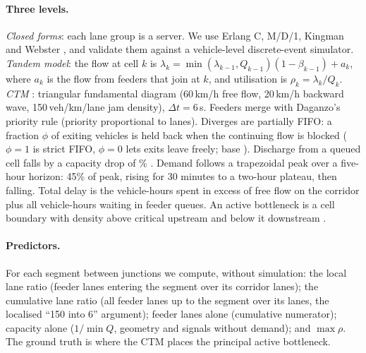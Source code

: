 \paragraph{Three levels.} \emph{Closed forms}: each lane group is a
server. We use Erlang C, M/D/1, Kingman \cite{kingman1961heavy} and
Webster \cite{webster1958signal}, and validate them against a
vehicle-level discrete-event simulator. \emph{Tandem model}: the flow at
cell $k$ is $\lambda_k = \min(\lambda_{k-1}, Q_{k-1})(1-\beta_{k-1}) +
a_k$, where $a_k$ is the flow from feeders that join at $k$, and
utilisation is $\rho_k = \lambda_k / Q_k$. \emph{CTM}
\cite{daganzo1994ctm,daganzo1995ctm}: triangular fundamental diagram
(60\,km/h free flow, 20\,km/h backward wave, 150\,veh/km/lane jam
density), $\Delta t = 6$\,s. Feeders merge with Daganzo's priority rule
(priority proportional to lanes). Diverges are partially FIFO: a fraction
$\phi$ of exiting vehicles is held back when the continuing flow is
blocked ($\phi = 1$ is strict FIFO, $\phi=0$ lets exits leave freely;
base \ThFifo). Discharge from a queued cell falls by a capacity drop of
\ThDrop\% \cite{hall1991capacity,chung2007capacity}. Demand follows a
trapezoidal peak over a five-hour horizon: 45\% of peak, rising for 30
minutes to a two-hour plateau, then falling. Total delay is the
vehicle-hours spent in excess of free flow on the corridor plus all
vehicle-hours waiting in feeder queues. An active bottleneck is a cell
boundary with density above critical upstream and below it downstream
\cite{cassidy1999bottlenecks}.

\paragraph{Predictors.} For each segment between junctions we compute,
without simulation: the local lane ratio (feeder lanes entering the
segment over its corridor lanes); the cumulative lane ratio (all feeder
lanes up to the segment over its lanes, the localised ``150 into 6''
argument); feeder lanes alone (cumulative numerator); capacity alone
($1/\min Q$, geometry and signals without demand); and $\max\rho$. The
ground truth is where the CTM places the principal active bottleneck.
